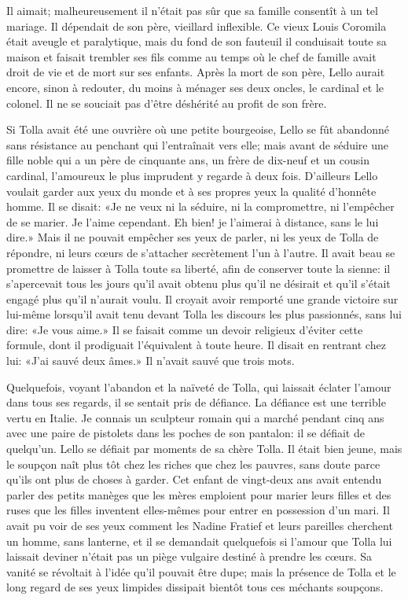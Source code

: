 Il aimait; malheureusement il n'était pas sûr que sa famille consentît à
un tel mariage. Il dépendait de son père, vieillard inflexible. Ce vieux
Louis Coromila était aveugle et paralytique, mais du fond de son
fauteuil il conduisait toute sa maison et faisait trembler ses fils
comme au temps où le chef de famille avait droit de vie et de mort sur
ses enfants. Après la mort de son père, Lello aurait encore, sinon à
redouter, du moins à ménager ses deux oncles, le cardinal et le colonel.
Il ne se souciait pas d'être déshérité au profit de son frère.

Si Tolla avait été une ouvrière où une petite bourgeoise, Lello se fût
abandonné sans résistance au penchant qui l'entraînait vers elle; mais
avant de séduire une fille noble qui a un père de cinquante ans, un
frère de dix-neuf et un cousin cardinal, l'amoureux le plus imprudent y
regarde à deux fois. D'ailleurs Lello voulait garder aux yeux du monde
et à ses propres yeux la qualité d'honnête homme. Il se disait: «Je ne
veux ni la séduire, ni la compromettre, ni l'empêcher de se marier. Je
l'aime cependant. Eh bien! je l'aimerai à distance, sans le lui dire.»
Mais il ne pouvait empêcher ses yeux de parler, ni les yeux de Tolla de
répondre, ni leurs cœurs de s'attacher secrètement l'un à l'autre. Il
avait beau se promettre de laisser à Tolla toute sa liberté, afin de
conserver toute la sienne: il s'apercevait tous les jours qu'il avait
obtenu plus qu'il ne désirait et qu'il s'était engagé plus qu'il
n'aurait voulu. Il croyait avoir remporté une grande victoire sur
lui-même lorsqu'il avait tenu devant Tolla les discours les plus
passionnés, sans lui dire: «Je vous aime.» Il se faisait comme un devoir
religieux d'éviter cette formule, dont il prodiguait l'équivalent à
toute heure. Il disait en rentrant chez lui: «J'ai sauvé deux âmes.» Il
n'avait sauvé que trois mots.

Quelquefois, voyant l'abandon et la naïveté de Tolla, qui laissait
éclater l'amour dans tous ses regards, il se sentait pris de défiance.
La défiance est une terrible vertu en Italie. Je connais un sculpteur
romain qui a marché pendant cinq ans avec une paire de pistolets dans
les poches de son pantalon: il se défiait de quelqu'un. Lello se défiait
par moments de sa chère Tolla. Il était bien jeune, mais le soupçon naît
plus tôt chez les riches que chez les pauvres, sans doute parce qu'ils
ont plus de choses à garder. Cet enfant de vingt-deux ans avait entendu
parler des petits manèges que les mères emploient pour marier leurs
filles et des ruses que les filles inventent elles-mêmes pour entrer en
possession d'un mari. Il avait pu voir de ses yeux comment les Nadine
Fratief et leurs pareilles cherchent un homme, sans lanterne, et il se
demandait quelquefois si l'amour que Tolla lui laissait deviner n'était
pas un piège vulgaire destiné à prendre les cœurs. Sa vanité se
révoltait à l'idée qu'il pouvait être dupe; mais la présence de Tolla et
le long regard de ses yeux limpides dissipait bientôt tous ces méchants
soupçons.

